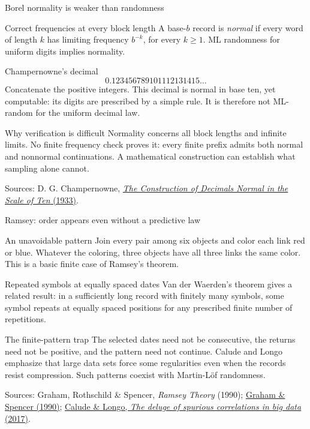 \documentclass{beamer}
\newcommand{\doiref}[2]{%
  \href{https://doi.org/#1}{\textcolor{blue!65!black}{#2}}}
\newcommand{\sourcefoot}[1]{%
  \par\vfill{\fontsize{6.3}{7.5}\selectfont\color{black!65}Sources: #1\par}}
\begin{document}
\begin{frame}{Borel normality is weaker than randomness}
\small
\begin{block}{Correct frequencies at every block length}
A base-$b$ record is \emph{normal} if every word of length $k$ has limiting
frequency $b^{-k}$, for every $k\geq1$.
ML randomness for uniform digits implies normality.
\end{block}
\begin{exampleblock}{Champernowne's decimal}
\[
  0.123456789101112131415\ldots
\]
Concatenate the positive integers. This decimal is normal in base ten,
yet computable: its digits are prescribed by a simple rule.
It is therefore not ML-random for the uniform decimal law.
\end{exampleblock}
\begin{alertblock}{Why verification is difficult}
Normality concerns all block lengths and infinite limits.
No finite frequency check proves it: every finite prefix admits both
normal and nonnormal continuations.
A mathematical construction can establish what sampling alone cannot.
\end{alertblock}
\sourcefoot{D. G. Champernowne,
\doiref{10.1112/jlms/s1-8.4.254}{\emph{The Construction of Decimals Normal in the Scale of Ten} (1933)}.}
\end{frame}

\begin{frame}{Ramsey: order appears even without a predictive law}
\small
\begin{block}{An unavoidable pattern}
Join every pair among six objects and color each link red or blue.
Whatever the coloring, three objects have all three links the same color.
This is a basic finite case of Ramsey's theorem.
\end{block}
\begin{exampleblock}{Repeated symbols at equally spaced dates}
Van der Waerden's theorem gives a related result: in a sufficiently long
record with finitely many symbols, some symbol repeats at equally spaced
positions for any prescribed finite number of repetitions.
\end{exampleblock}
\begin{alertblock}{The finite-pattern trap}
The selected dates need not be consecutive, the returns need not be positive,
and the pattern need not continue. Calude and Longo emphasize that large
data sets force some regularities even when the records resist compression.
Such patterns coexist with Martin-L\"of randomness.
\end{alertblock}
\sourcefoot{Graham, Rothschild \& Spencer, \emph{Ramsey Theory} (1990);
\doiref{10.1038/scientificamerican0790-112}{Graham \& Spencer (1990)};
\doiref{10.1007/s10699-016-9489-4}{Calude \& Longo, \emph{The deluge of spurious correlations in big data} (2017)}.}
\end{frame}
\end{document}
